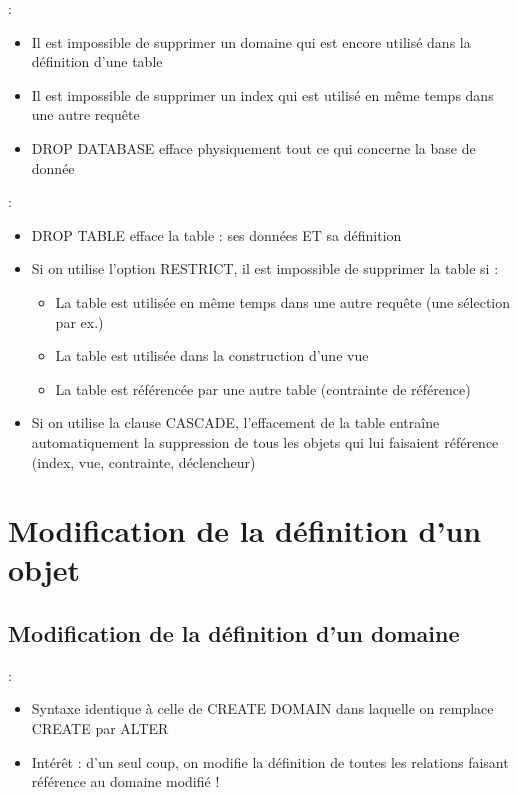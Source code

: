 \documentclass[10pt]{beamer}
\begin{document}
\begin{frame}{\secname : \subsecname}
    \begin{itemize}
        \item Il est impossible de supprimer un domaine qui est encore utilisé dans la définition d'une table
        \item Il est impossible de supprimer un index qui est utilisé en même temps dans une autre requête
        \item DROP DATABASE efface physiquement tout ce qui concerne la base de donnée
    \end{itemize}
\end{frame}

\begin{frame}{\secname : \subsecname}
    \begin{itemize}
        \item DROP TABLE efface la table : ses données ET sa définition
        \item Si on utilise l'option RESTRICT, il est impossible de supprimer la table si :
              \begin{itemize}
                  \item La table est utilisée en même temps dans une autre requête (une sélection par ex.)
                  \item La table est utilisée dans la construction d'une vue
                  \item La table est référencée par une autre table (contrainte de référence)
              \end{itemize}
        \item Si on utilise la clause CASCADE, l'effacement de la table entraîne automatiquement la suppression de tous les objets qui lui faisaient référence (index, vue, contrainte, déclencheur)
    \end{itemize}
\end{frame}

\section{Modification de la définition d’un objet}
\tocss
\subsection{Modification de la définition d'un domaine}
\begin{frame}{\secname : \subsecname}
    \begin{itemize}
        \item Syntaxe identique à celle de CREATE DOMAIN dans laquelle on remplace CREATE par ALTER
        \item Intérêt : d'un seul coup, on modifie la définition de toutes les relations faisant référence au domaine modifié !
    \end{itemize}
\end{frame}
\end{document}
